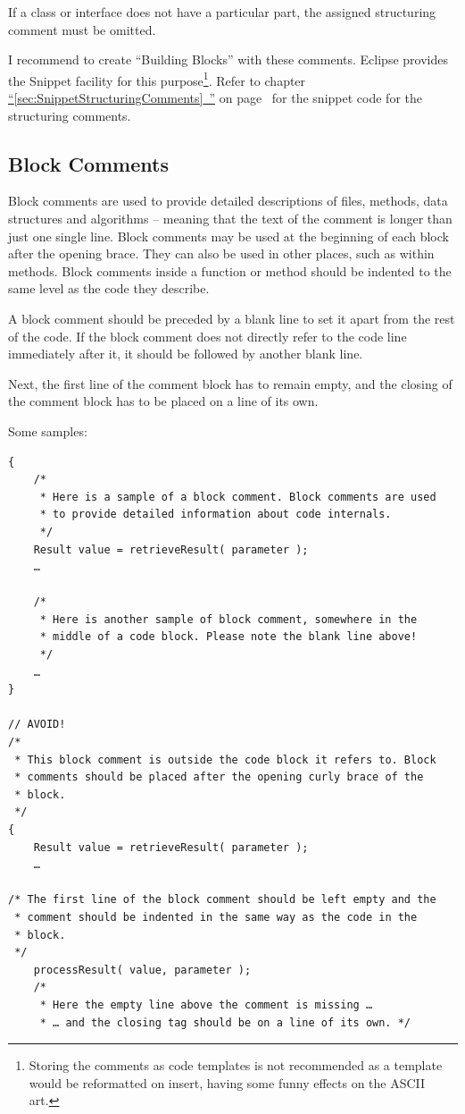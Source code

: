 \documentclass[11pt,a4paper, titlepage, parskip=half, headsepline, footsepline, cleardoublepage=current, headheight=1cm]{scrbook}
\newcommand*{\tqfullvref}[1]{\hyperref[{#1}]{“\ref*{#1}~\nameref*{#1}”} on page~\pageref{#1}}
\begin{document}
If a class or interface does not have a particular part, the assigned structuring comment must be omitted.

I recommend to create “Building Blocks” with these comments. Eclipse provides the Snippet facility for this purpose\footnote{Storing the comments as code templates is not recommended as a template would be reformatted on insert, having some funny effects on the ASCII art.}. Refer to chapter \tqfullvref{sec:SnippetStructuringComments} for the snippet code for the structuring comments.


\subsection{Block Comments}\label{sec:BlockComments}
Block comments are used to provide detailed descriptions of files, methods, data structures and algorithms – meaning that the text of the comment is longer than just one single line. Block comments may be used at the beginning of each block after the opening brace. They can also be used in other places, such as within methods. Block comments inside a function or method should be indented to the same level as the code they describe.

A block comment should be preceded by a blank line to set it apart from the rest of the code. If the block comment does not directly refer to the code line immediately after it, it should be followed by another blank line.

Next, the first line of the comment block has to remain empty, and the closing of the comment block has to be placed on a line of its own.

Some samples:
\begin{lstlisting}
{
    /*
     * Here is a sample of a block comment. Block comments are used
     * to provide detailed information about code internals.
     */
    Result value = retrieveResult( parameter );
    …

    /*
     * Here is another sample of block comment, somewhere in the
     * middle of a code block. Please note the blank line above!
     */
    …
}

// AVOID!
/*
 * This block comment is outside the code block it refers to. Block 
 * comments should be placed after the opening curly brace of the
 * block.
 */
{
    Result value = retrieveResult( parameter );
    …
 
/* The first line of the block comment should be left empty and the
 * comment should be indented in the same way as the code in the
 * block.
 */
    processResult( value, parameter );
    /* 
     * Here the empty line above the comment is missing …
     * … and the closing tag should be on a line of its own. */
\end{lstlisting}
 
\end{document}
